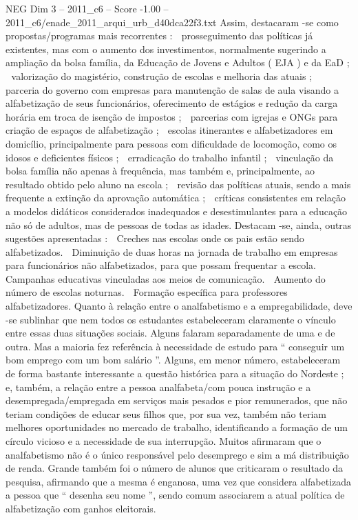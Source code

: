 \begin{textsample}{NEG Dim 3 – 2011\_c6 – Score -1.00 – 2011\_c6/enade\_2011\_arqui\_urb\_d40dca22f3.txt}
Assim, destacaram -se como propostas/programas mais recorrentes :  prosseguimento das políticas já existentes, mas com o aumento dos investimentos, normalmente sugerindo a ampliação da bolsa família, da Educação de Jovens e Adultos ( EJA ) e da EaD ;  valorização do magistério, construção de escolas e melhoria das atuais ;  parceria do governo com empresas para manutenção de salas de aula visando a alfabetização de seus funcionários, oferecimento de estágios e redução da carga horária em troca de isenção de impostos ;  parcerias com igrejas e ONGs para criação de espaços de alfabetização ;  escolas itinerantes e alfabetizadores em domicílio, principalmente para pessoas com dificuldade de locomoção, como os idosos e deficientes físicos ;  erradicação do trabalho infantil ;  vinculação da bolsa família não apenas à frequência, mas também e, principalmente, ao resultado obtido pelo aluno na escola ;  revisão das políticas atuais, sendo a mais frequente a extinção da aprovação automática ;  críticas consistentes em relação a modelos didáticos considerados inadequados e desestimulantes para a educação não só de adultos, mas de pessoas de todas as idades.
Destacam -se, ainda, outras sugestões apresentadas :  Creches nas escolas onde os pais estão sendo alfabetizados.  Diminuição de duas horas na jornada de trabalho em empresas para funcionários não alfabetizados, para que possam frequentar a escola.  Campanhas educativas vinculadas aos meios de comunicação.  Aumento do número de escolas noturnas.  Formação específica para professores alfabetizadores.
Quanto à relação entre o analfabetismo e a empregabilidade, deve -se sublinhar que nem todos os estudantes estabeleceram claramente o vínculo entre essas duas situações sociais.
Alguns falaram separadamente de uma e de outra.
Mas a maioria fez referência à necessidade de estudo para “ conseguir um bom emprego com um bom salário ”.
Alguns, em menor número, estabeleceram de forma bastante interessante a questão histórica para a situação do Nordeste ; e, também, a relação entre a pessoa analfabeta/com pouca instrução e a desempregada/empregada em serviços mais pesados e pior remunerados, que não teriam condições de educar seus filhos que, por sua vez, também não teriam melhores oportunidades no mercado de trabalho, identificando a formação de um círculo vicioso e a necessidade de sua interrupção.
Muitos afirmaram que o analfabetismo não é o único responsável pelo desemprego e sim a má distribuição de renda.
Grande também foi o número de alunos que criticaram o resultado da pesquisa, afirmando que a mesma é enganosa, uma vez que considera alfabetizada a pessoa que “ desenha seu nome ”, sendo comum associarem a atual política de alfabetização com ganhos eleitorais.

\end{textsample}
